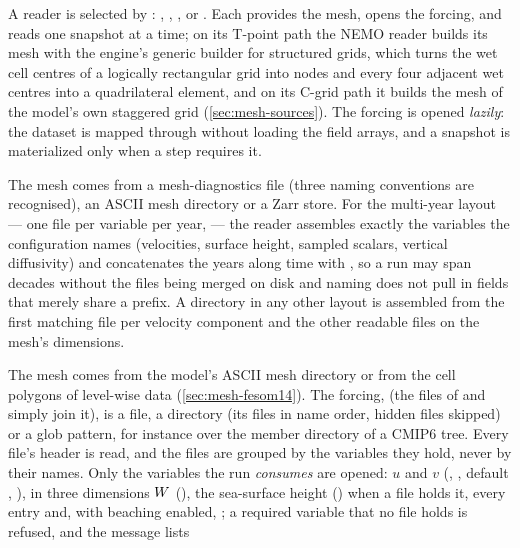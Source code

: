 A reader is selected by : , , ,  or
. Each
provides the mesh, opens the forcing, and reads one snapshot at a time; on its T-point path the NEMO reader
builds its mesh with the engine's generic builder for structured grids, which turns the wet cell centres of a
logically rectangular grid into nodes and every four adjacent wet centres into a quadrilateral element, and on
its C-grid path it builds the mesh of the model's own staggered grid (\cref{sec:mesh-sources}). The forcing is opened \emph{lazily}: the dataset is mapped through 
without loading the field arrays, and a snapshot is materialized only when a step requires it.
\begin{description}[font=\normalfont\bfseries,style=nextline,leftmargin=1.5em]
  \item[FESOM2] The mesh comes from a mesh-diagnostics file (three naming conventions are recognised), an
    ASCII mesh directory or a Zarr store. For the multi-year layout --- one file per variable per year,
     --- the reader assembles exactly the variables the configuration names
    (velocities, surface height, sampled scalars, vertical diffusivity) and concatenates the years along time
    with , so a run may span decades without the files being merged on disk and naming
     does not pull in fields that merely share a prefix. A directory in any other layout is
    assembled from the first matching file per velocity component and the other readable files on the mesh's
    dimensions.
  \item[FESOM~1.4] The mesh comes from the model's ASCII mesh directory or from the cell polygons of
    level-wise data (\cref{sec:mesh-fesom14}). The forcing,  (the files of
     and  simply join it), is a file, a directory (its  files in
    name order, hidden files skipped) or a glob pattern, for instance over the member directory of a CMIP6
    tree. Every file's header is read, and the files are grouped by the variables they hold, never by their
    names. Only the variables the run \emph{consumes} are opened: $u$ and $v$ (,
    , default , ), in three dimensions $W$ (), the sea-surface
    height () when a file holds it, every  entry and, with beaching enabled,
    ; a required variable that no file holds is refused, and the message lists

\end{description}
